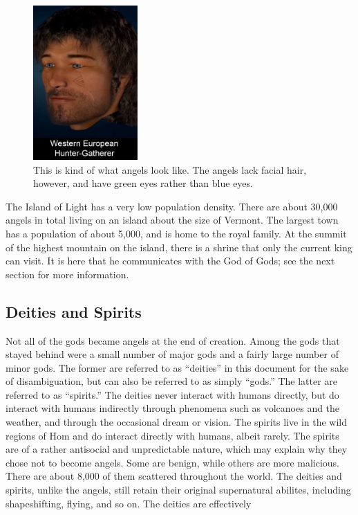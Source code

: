 \documentclass{article}
\begin{document}
\begin{figure}[h]
  \centering
  \includegraphics[width=4cm]{whg}
  \caption{This is kind of what angels look like. The angels lack facial hair, however, and have green eyes rather than blue eyes.}
\end{figure}

The Island of Light has a very low population density. There are about 30,000 angels in total living on an island about the size of Vermont. The largest town has a population of about 5,000, and is home to the royal family. At the summit of the highest mountain on the island, there is a shrine that only the current king can visit. It is here that he communicates with the God of Gods; see the next section for more information.

\subsection{Deities and Spirits}

Not all of the gods became angels at the end of creation. Among the gods that stayed behind were a small number of major gods and a fairly large number of minor gods. The former are referred to as ``deities'' in this document for the sake of disambiguation, but can also be referred to as simply ``gods.'' The latter are referred to as ``spirits.'' The deities never interact with humans directly, but do interact with humans indirectly through phenomena such as volcanoes and the weather, and through the occasional dream or vision. The spirits live in the wild regions of Hom and do interact directly with humans, albeit rarely. The spirits are of a rather antisocial and unpredictable nature, which may explain why they chose not to become angels. Some are benign, while others are more malicious. There are about 8,000 of them scattered throughout the world. The deities and spirits, unlike the angels, still retain their original supernatural abilites, including shapeshifting, flying, and so on. The deities are effectively 
\end{document}
